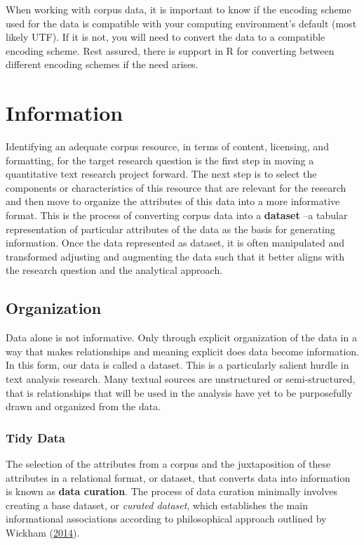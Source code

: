 \documentclass[
  letterpaper,
  DIV=11,
  numbers=noendperiod]{scrreport}
\theoremstyle{definition}
\theoremstyle{remark}
\begin{document}
When working with corpus data, it is important to know if the encoding
scheme used for the data is compatible with your computing environment's
default (most likely UTF). If it is not, you will need to convert the
data to a compatible encoding scheme. Rest assured, there is support in
R for converting between different encoding schemes if the need arises.

\hypertarget{information}{%
\section{Information}\label{information}}

Identifying an adequate corpus resource, in terms of content, licensing,
and formatting, for the target research question is the first step in
moving a quantitative text research project forward. The next step is to
select the components or characteristics of this resource that are
relevant for the research and then move to organize the attributes of
this data into a more informative format. This is the process of
converting corpus data into a \textbf{dataset} --a
tabular representation of particular attributes of the data as the basis
for generating information. Once the data represented as dataset, it is
often manipulated and transformed adjusting and augmenting the data such
that it better aligns with the research question and the analytical
approach.

\hypertarget{sec-ud-organization}{%
\subsection{Organization}\label{sec-ud-organization}}

Data alone is not informative. Only through explicit organization of the
data in a way that makes relationships and meaning explicit does data
become information. In this form, our data is called a dataset. This is
a particularly salient hurdle in text analysis research. Many textual
sources are unstructured or semi-structured, that is relationships that
will be used in the analysis have yet to be purposefully drawn and
organized from the data.

\hypertarget{sec-ud-tidy-data}{%
\subsubsection{Tidy Data}\label{sec-ud-tidy-data}}

The selection of the attributes from a corpus and the juxtaposition of
these attributes in a relational format, or dataset, that converts data
into information is known as \textbf{data curation}. The process of data
curation minimally involves creating a base dataset, or \emph{curated
dataset}, which establishes the main informational associations
according to philosophical approach outlined by Wickham
(\protect\hyperlink{ref-Wickham2014a}{2014}).
\end{document}
